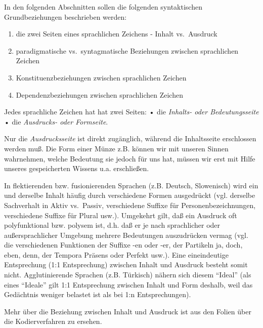\documentclass[
]{article}
\providecommand{\tightlist}{%
  \setlength{\itemsep}{0pt}\setlength{\parskip}{0pt}}
\begin{document}
In den folgenden Abschnitten sollen die folgenden syntaktischen Grundbeziehungen beschrieben werden:

\begin{enumerate}
\def\labelenumi{\arabic{enumi}.}
\tightlist
\item
  die zwei Seiten eines sprachlichen Zeichens - Inhalt vs.~Ausdruck
\item
  paradigmatische vs.~syntagmatische Beziehungen zwischen sprachlichen Zeichen
\item
  Konstituenzbeziehungen zwischen sprachlichen Zeichen
\item
  Dependenzbeziehungen zwischen sprachlichen Zeichen
\end{enumerate}

Jedes sprachliche Zeichen hat hat zwei Seiten:
• die \emph{Inhalts- oder Bedeutungsseite}
• die \emph{Ausdrucks- oder Formseite}.

Nur die \emph{Ausdrucksseite} ist direkt zugänglich, während die Inhaltsseite erschlossen werden muß. Die Form einer Münze z.B. können wir mit unseren Sinnen wahrnehmen, welche Bedeutung sie jedoch für uns hat, müssen wir erst mit Hilfe unseres gespeicherten Wissens u.a. erschließen.

In flektierenden bzw. fusionierenden Sprachen (z.B. Deutsch, Slowenisch) wird ein und derselbe Inhalt häufig durch verschiedene Formen ausgedrückt (vgl. derselbe Sachverhalt in Aktiv vs.~Passiv, verschiedene Suffixe für Personenbezeichnungen, verschiedene Suffixe für Plural usw.). Umgekehrt gilt, daß ein Ausdruck oft polyfunktional bzw. polysem ist, d.h. daß er je nach sprachlicher oder außersprachlicher Umgebung mehrere Bedeutungen auszudrücken vermag (vgl. die verschiedenen Funktionen der Suffixe -en oder -er, der Partikeln ja, doch, eben, denn, der Tempora Präsens oder Perfekt usw.). Eine eineindeutige Entsprechung (1:1 Entsprechung) zwischen Inhalt und Ausdruck besteht somit nicht. Agglutinierende Sprachen (z.B. Türkisch) nähern sich diesem ``Ideal'' (als eines ``Ideale'' gilt 1:1 Entsprechung zwischen Inhalt und Form deshalb, weil das Gedächtnis weniger belastet ist als bei 1:n Entsprechungen).

Mehr über die Beziehung zwischen Inhalt und Ausdruck ist aus den Folien über die Kodierverfahren zu ersehen.
\end{document}
